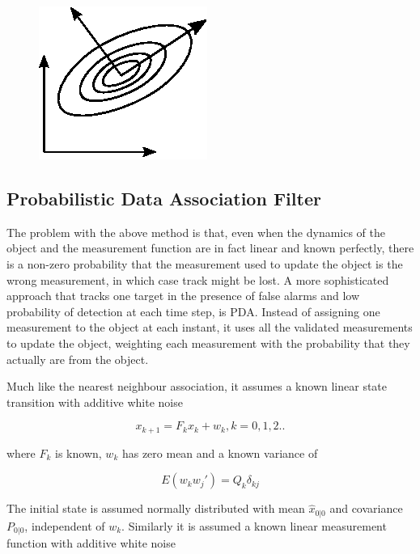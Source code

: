 \begin{figure}
    \centering
    \includegraphics[width=0.5\linewidth]{0_Images/3_Theory/GaussianPrincipalAxis.eps}
    \label{Fig:GaussianPrincipalAxes}
\end{figure}

\subsection{Probabilistic Data Association Filter}

The problem with the above method is that, even when the dynamics of the object and the measurement function are in fact linear and known perfectly, there is a non-zero probability that the measurement used to update the object is the wrong measurement, in which case track might be lost. A more sophisticated approach that tracks one target in the presence of false alarms and low probability of detection at each time step, is \gls{PDA}\cite{BarShalomPDA}. Instead of assigning one measurement to the object at each instant, it uses all the validated measurements to update the object, weighting each measurement with the probability that they actually are from the object.  

Much like the nearest neighbour association, it assumes a known linear state transition with additive white noise

\begin{equation}
    x_{k+1} = F_kx_k + w_k, k=0,1,2..
\end{equation}

where $F_k$ is known, $w_k$ has zero mean and a known variance of 

\begin{equation}
    E(w_kw_j') = Q_k\delta_{kj}
\end{equation}

The initial state is assumed normally distributed with mean $\hat{x}_{0|0}$ and covariance $P_{0|0}$, independent of $w_k$. Similarly it is assumed a known linear measurement function with additive white noise


